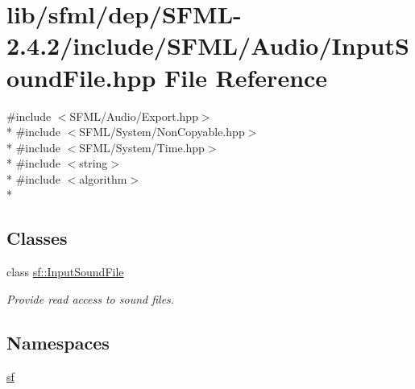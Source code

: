 \hypertarget{sfml_2dep_2_s_f_m_l-2_84_82_2include_2_s_f_m_l_2_audio_2_input_sound_file_8hpp}{\section{lib/sfml/dep/\-S\-F\-M\-L-\/2.4.2/include/\-S\-F\-M\-L/\-Audio/\-Input\-Sound\-File.hpp File Reference}
\label{sfml_2dep_2_s_f_m_l-2_84_82_2include_2_s_f_m_l_2_audio_2_input_sound_file_8hpp}
}
{\ttfamily \#include $<$S\-F\-M\-L/\-Audio/\-Export.\-hpp$>$}\\*
{\ttfamily \#include $<$S\-F\-M\-L/\-System/\-Non\-Copyable.\-hpp$>$}\\*
{\ttfamily \#include $<$S\-F\-M\-L/\-System/\-Time.\-hpp$>$}\\*
{\ttfamily \#include $<$string$>$}\\*
{\ttfamily \#include $<$algorithm$>$}\\*
\subsection*{Classes}
\begin{DoxyCompactItemize}
\item 
class \hyperlink{classsf_1_1_input_sound_file}{sf\-::\-Input\-Sound\-File}
\begin{DoxyCompactList}\small\item\em Provide read access to sound files. \end{DoxyCompactList}\end{DoxyCompactItemize}
\subsection*{Namespaces}
\begin{DoxyCompactItemize}
\item 
\hyperlink{namespacesf}{sf}
\end{DoxyCompactItemize}
